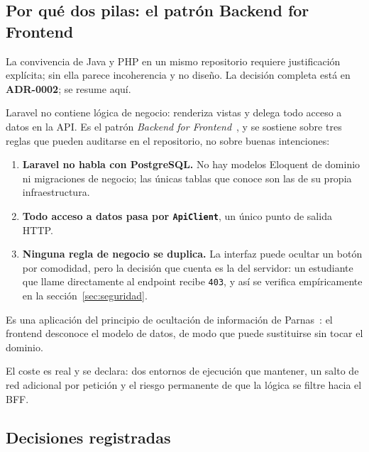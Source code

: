 \documentclass[11pt,a4paper]{article}
\newcommand{\adr}[1]{\textbf{ADR-#1}}
\begin{document}
\subsection{Por qué dos pilas: el patrón Backend for Frontend}

La convivencia de Java y PHP en un mismo repositorio requiere justificación
explícita; sin ella parece incoherencia y no diseño. La decisión completa está en
\adr{0002}; se resume aquí.

Laravel no contiene lógica de negocio: renderiza vistas y delega todo acceso a
datos en la API. Es el patrón \emph{Backend for
Frontend}~\cite{newman2021building}, y se sostiene sobre tres reglas que pueden
auditarse en el repositorio, no sobre buenas intenciones:

\begin{enumerate}[leftmargin=*]
  \item \textbf{Laravel no habla con PostgreSQL.} No hay modelos Eloquent de
        dominio ni migraciones de negocio; las únicas tablas que conoce son las de
        su propia infraestructura.
  \item \textbf{Todo acceso a datos pasa por \texttt{ApiClient}}, un único punto de
        salida HTTP.
  \item \textbf{Ninguna regla de negocio se duplica.} La interfaz puede ocultar un
        botón por comodidad, pero la decisión que cuenta es la del servidor: un
        estudiante que llame directamente al endpoint recibe \texttt{403}, y así
        se verifica empíricamente en la sección~\ref{sec:seguridad}.
\end{enumerate}

Es una aplicación del principio de ocultación de información de
Parnas~\cite{parnas1972criteria}: el frontend desconoce el modelo de datos, de
modo que puede sustituirse sin tocar el dominio.

El coste es real y se declara: dos entornos de ejecución que mantener, un salto
de red adicional por petición y el riesgo permanente de que la lógica se filtre
hacia el BFF.

\subsection{Decisiones registradas}
\end{document}
